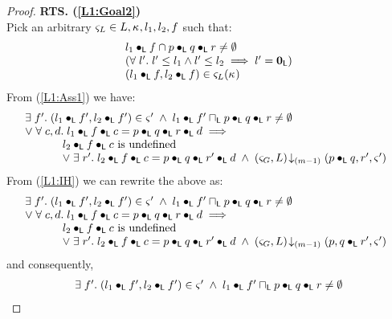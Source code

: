 \begin{lemma}
\begin{proof}
\noindent\textbf{RTS. (\ref{L1:Goal2})}\\
Pick an arbitrary $\varsigma_{L} \in L, \kappa_{}, l_1, l_2, f $ such that:
%
\begin{align}
	\begin{array}{l}
		l_1 \bullet_{\textsf{L}} f \cap p \bullet_{\textsf{L}} q \bullet_{\textsf{L}} r \not= \emptyset \\
		\left(\forall\; l'.\; l' \leq l_1 \land l' \leq l_2 \implies l' = \mathbf{0}_{\textsf{L}}\right)\\
  	(l_1 \bullet_{\textsf{L}} f, l_2 \bullet_{\textsf{L}} f) \in \varsigma_{L}(\kappa_{}) \\
	\end{array} \label{LCS: Ass1}
\end{align} 
%
From (\ref{L1:Ass1}) we have:
%
\[
\begin{array}{l}
	\exists\; f'.\; (l_1 \bullet_{\textsf{L}} f', l_2 \bullet_{\textsf{L}} f') \in \varsigma_{}' \;\land\; l_1 \bullet_{\textsf{L}} f' \sqcap_{\textsf{L}} p \bullet_{\textsf{L}} q \bullet_{\textsf{L}} r \not= \emptyset\\
	\lor\;\forall\; c, d.\;  l_1 \bullet_{\textsf{L}} f \bullet_{\textsf{L}} c = p \bullet_{\textsf{L}} q \bullet_{\textsf{L}} r \bullet_{\textsf{L}} d \implies\\
	\hspace*{1cm}
	\begin{array}{l l}
		l_2 \bullet_{\textsf{L}} f \bullet_{\textsf{L}} c \text{ is undefined}\\
		\lor\; \exists\; r'.\; l_2 \bullet_{\textsf{L}} f \bullet_{\textsf{L}} c = p \bullet_{\textsf{L}} q \bullet_{\textsf{L}} r' \bullet_{\textsf{L}} d \;\land\; \left(\varsigma_{G}, L\right) \!\downarrow_{(m-1)} \left(p \bullet_{\textsf{L}} q, r', \varsigma_{}'\right)
	\end{array}
\end{array}
\]
%
From (\ref{L1:IH}) we can rewrite the above as: 
%
\[
\begin{array}{l}
	\exists\; f'.\; (l_1 \bullet_{\textsf{L}} f', l_2 \bullet_{\textsf{L}} f') \in \varsigma_{}' \;\land\; l_1 \bullet_{\textsf{L}} f' \sqcap_{\textsf{L}} p \bullet_{\textsf{L}} q \bullet_{\textsf{L}} r \not= \emptyset\\
	\lor\;\forall\; c, d.\;  l_1 \bullet_{\textsf{L}} f \bullet_{\textsf{L}} c = p \bullet_{\textsf{L}} q \bullet_{\textsf{L}} r \bullet_{\textsf{L}} d \implies\\
	\hspace*{1cm}
	\begin{array}{l l}
		l_2 \bullet_{\textsf{L}} f \bullet_{\textsf{L}} c \text{ is undefined}\\
		\lor\; \exists\; r'.\; l_2 \bullet_{\textsf{L}} f \bullet_{\textsf{L}} c = p \bullet_{\textsf{L}} q \bullet_{\textsf{L}} r' \bullet_{\textsf{L}} d \;\land\; \left(\varsigma_{G}, L\right) \!\downarrow_{(m-1)} \left(p, q \bullet_{\textsf{L}} r', \varsigma_{}'\right)
	\end{array}
\end{array}
\]
%
and consequently,
%
\[
\begin{array}{l}
	\exists\; f'.\; (l_1 \bullet_{\textsf{L}} f', l_2 \bullet_{\textsf{L}} f') \in \varsigma_{}' \;\land\; l_1 \bullet_{\textsf{L}} f' \sqcap_{\textsf{L}} p \bullet_{\textsf{L}} q \bullet_{\textsf{L}} r \not= \emptyset\\

\end{array}\]
\end{proof}
\end{lemma}
